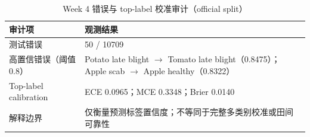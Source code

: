 \begin{table}[htbp]
\centering
\caption{Week 4 错误与 top-label 校准审计（official split）}
\label{tab:week4-analysis-zh}
\begin{tabular}{p{}p{}}
\toprule
审计项 & 观测结果 \\
\midrule
测试错误 & 50 / 10709 \\
高置信错误（阈值 0.8） & Potato late blight $\rightarrow$ Tomato late blight（0.8475）；Apple scab $\rightarrow$ Apple healthy（0.8322） \\
Top-label calibration & ECE 0.0965；MCE 0.3348；Brier 0.0140 \\
解释边界 & 仅衡量预测标签置信度；不等同于完整多类别校准或田间可靠性 \\
\bottomrule
\end{tabular}
\end{table}
